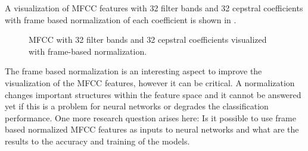 A visualization of MFCC features with 32 filter bands and 32 cepstral coefficients with frame based normalization of each coefficient is shown in .
\begin{figure}[!ht]
  \centering
  \caption{MFCC with 32 filter bands and 32 cepstral coefficients visualized with frame-based normalization.}
  \label{fig:signal_mfcc_showcase_mfcc32}
\end{figure}
\FloatBarrier
\noindent
The frame based normalization is an interesting aspect to improve the visualization of the MFCC features, however it can be critical. 
A normalization changes important structures within the feature space and it cannot be answered yet if this is a problem for neural networks or degrades the classification performance.
One more research question arises here: Is it possible to use frame based normalized MFCC features as inputs to neural networks and what are the results to the accuracy and training of the models.


